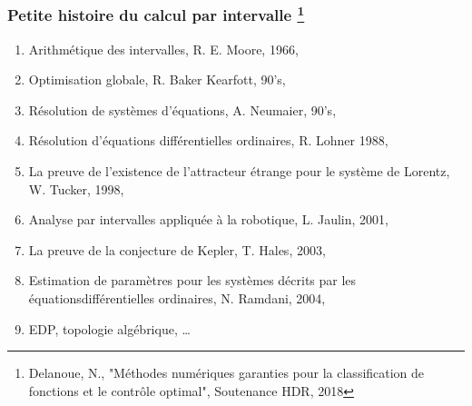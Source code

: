 \documentclass{beamer}
\begin{document}
\begin{frame}
    \frametitle{Petite histoire du calcul par intervalle \footnote{\tiny Delanoue, N., "Méthodes numériques garanties pour la classification de fonctions et le contrôle optimal", Soutenance HDR, 2018}}
    \begin{block}{}
        \small
        \begin{enumerate}
            \item Arithmétique des intervalles, R. E. Moore, 1966,
            \item Optimisation globale, R. Baker Kearfott, 90’s,
            \item Résolution de systèmes d’équations, A. Neumaier, 90’s,
            \item Résolution d’équations différentielles ordinaires, R. Lohner 1988,
            \item La preuve de l’existence de l’attracteur étrange pour le système de Lorentz, W. Tucker, 1998,
            \item Analyse par intervalles appliquée à la robotique, L. Jaulin, 2001,
            \item La preuve de la conjecture de Kepler, T. Hales, 2003,
            \item Estimation de paramètres pour les systèmes décrits par les équationsdifférentielles ordinaires, N. Ramdani, 2004,
            \item EDP, topologie algébrique, \dots
        \end{enumerate}
    \end{block}
\end{frame}
\end{document}
